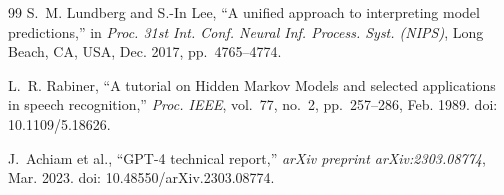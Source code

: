 \documentclass[12pt,a4paper]{report}
\theoremstyle{definition}
\theoremstyle{remark}
\begin{document}
\begin{thebibliography}{99}
S.~M. Lundberg and S.-In Lee, ``A unified approach to interpreting model predictions,'' in {\em Proc. 31st Int. Conf. Neural Inf. Process. Syst. (NIPS)}, Long Beach, CA, USA, Dec. 2017, pp.~4765--4774.

L.~R. Rabiner, ``A tutorial on Hidden Markov Models and selected applications in speech recognition,'' {\em Proc. IEEE}, vol.~77, no.~2, pp.~257--286, Feb. 1989. doi: 10.1109/5.18626.

J.~Achiam et al., ``GPT-4 technical report,'' {\em arXiv preprint arXiv:2303.08774}, Mar. 2023. doi: 10.48550/arXiv.2303.08774.

\end{thebibliography}


\end{document}
